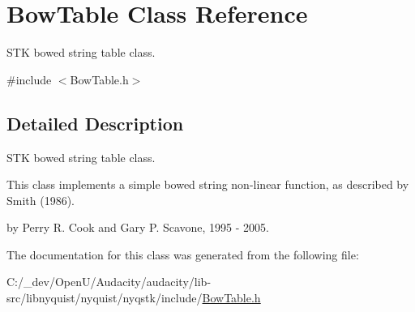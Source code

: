 \hypertarget{class_bow_table}{}\section{Bow\+Table Class Reference}
\label{class_bow_table}


S\+TK bowed string table class.  




{\ttfamily \#include $<$Bow\+Table.\+h$>$}



\subsection{Detailed Description}
S\+TK bowed string table class. 

This class implements a simple bowed string non-\/linear function, as described by Smith (1986).

by Perry R. Cook and Gary P. Scavone, 1995 -\/ 2005. 

The documentation for this class was generated from the following file\+:\begin{DoxyCompactItemize}
\item 
C\+:/\+\_\+dev/\+Open\+U/\+Audacity/audacity/lib-\/src/libnyquist/nyquist/nyqstk/include/\hyperlink{_bow_table_8h}{Bow\+Table.\+h}\end{DoxyCompactItemize}
